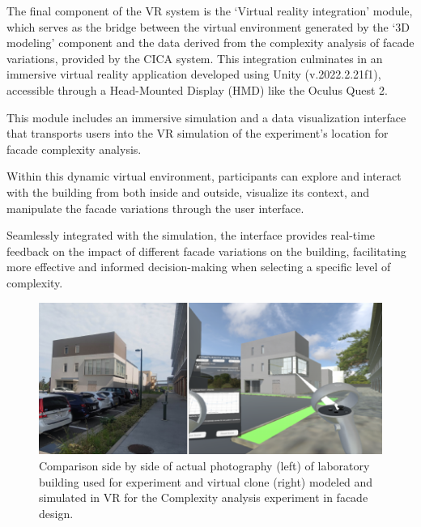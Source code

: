 

The final component of the VR system is the `Virtual reality integration' module, which serves as the bridge between the virtual environment generated by the `3D modeling' component and the data derived from the complexity analysis of facade variations, provided by the CICA system.
This integration culminates in an immersive virtual reality application developed using Unity (v.2022.2.21f1), accessible through a Head-Mounted Display (HMD) like the Oculus Quest 2.


This module includes an immersive simulation and a data visualization interface that transports users into the VR simulation of the experiment's location for facade complexity analysis.

Within this dynamic virtual environment, participants can explore and interact with the building from both inside and outside, visualize its context, and manipulate the facade variations through the user interface.

Seamlessly integrated with the simulation, the interface provides real-time feedback on the impact of different facade variations on the building, facilitating more effective and informed decision-making when selecting a specific level of complexity.

     \begin{figure}[htb]
          \centering
          \includegraphics[width= \linewidth]{Images/RealvsVRBuildling}
          \caption{Comparison side by side of actual photography (left) of laboratory building used for experiment and virtual clone (right) modeled and simulated in VR for the Complexity analysis experiment in facade design.}
          \label{fig:RealVsVR}
        \end{figure}

